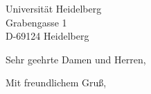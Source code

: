 \documentclass[fachschaft=mathematik]{./mathphys-letter}
\begin{document}
    \begin{letter}{
        Universität Heidelberg\\
        Grabengasse 1\\
        D-69124 Heidelberg\\
    }

        \opening{Sehr geehrte Damen und Herren,}
            \blindtext
        \closing{Mit freundlichem Gruß,}

    \end{letter}
\end{document}
